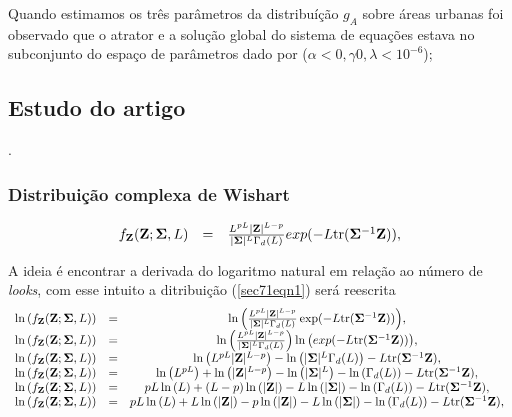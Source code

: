 \documentclass[10pt,a4paper]{article}
\begin{document}
Quando estimamos os três parâmetros da distribuíção $g_A$ sobre áreas urbanas foi observado que o atrator e a solução global do sistema de equações estava  no subconjunto do espaço de parâmetros dado por ($\alpha<0,\gamma0,\lambda<10^{-6}$); 

\subsection{Estudo do artigo  \cite{frery_nascimento_2014}}.

\subsubsection{Distribuição complexa de Wishart}

\begin{equation}\label{sec71eqn1}
\begin{array}{ccc}
	f_{{\bf Z}}({\bf Z};{\bf \Sigma},L)&=&\frac{L^{pL}|{\bf Z}|^{L-p}}{|{\bf \Sigma}|^{L}\Gamma_d(L)} exp(-L\mathrm{tr}{({\bf \Sigma}^{-1}{\bf Z})}), \\
\end{array}
\end{equation}

A ideia é encontrar a derivada do logaritmo natural em relação ao número de {\it looks}, com esse intuito a ditribuição (\ref{sec71eqn1}) será reescrita
\begin{equation}\label{sec71eqn2}
\begin{array}{ccc}
	\ln{\left(f_{{\bf Z}}({\bf Z};{\bf \Sigma},L)\right)}&=&\ln{\left(\frac{L^{pL}|{\bf Z}|^{L-p}}{|{\bf \Sigma}|^{L}\Gamma_d(L)} \exp(-L\mathrm{tr}{({\bf \Sigma}^{-1}{\bf Z})})\right)}, \\
	\ln{\left(f_{{\bf Z}}({\bf Z};{\bf \Sigma},L)\right)}&=&\ln{\left(\frac{L^{pL}|{\bf Z}|^{L-p}}{|{\bf \Sigma}|^{L}\Gamma_d(L)}\right)}\ln{\left( exp(-L\mathrm{tr}{({\bf \Sigma}^{-1}{\bf Z})})\right)}, \\
	\ln{\left(f_{{\bf Z}}({\bf Z};{\bf \Sigma},L)\right)}&=&\ln{\left(L^{pL}|{\bf Z}|^{L-p}\right)} - \ln{\left(|{\bf \Sigma}|^{L}\Gamma_d(L)\right)}-L\mathrm{tr}{({\bf \Sigma}^{-1}{\bf Z})}, \\
	\ln{\left(f_{{\bf Z}}({\bf Z};{\bf \Sigma},L)\right)}&=&\ln{\left(L^{pL}\right)}+\ln{\left( |{\bf Z}|^{L-p}\right)} - \ln{\left(|{\bf \Sigma}|^{L}\right)}-\ln{\left(\Gamma_d(L)\right)}-L\mathrm{tr}{({\bf \Sigma}^{-1}{\bf Z})}, \\
	\ln{\left(f_{{\bf Z}}({\bf Z};{\bf \Sigma},L)\right)}&=&pL\ln{\left(L\right)}+(L-p)\ln{\left( |{\bf Z}|\right)} - L\ln{\left(|{\bf \Sigma}|\right)}-\ln{\left(\Gamma_d(L)\right)}-L\mathrm{tr}{({\bf \Sigma}^{-1}{\bf Z})}, \\
	\ln{\left(f_{{\bf Z}}({\bf Z};{\bf \Sigma},L)\right)}&=&pL\ln{\left(L\right)}+L\ln{\left( |{\bf Z}|\right)}-p\ln{\left( |{\bf Z}|\right)}- L\ln{\left(|{\bf \Sigma}|\right)}-\ln{\left(\Gamma_d(L)\right)}-L\mathrm{tr}{({\bf \Sigma}^{-1}{\bf Z})}, \\
\end{array}
\end{equation}
\end{document}
